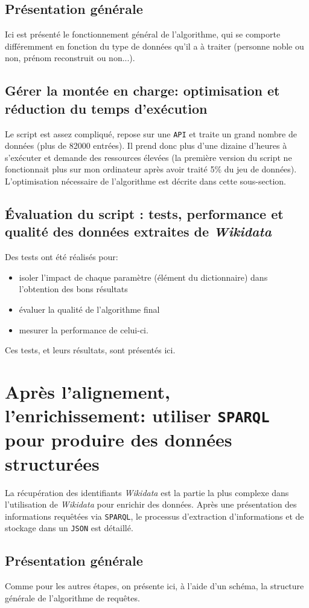 \documentclass[a4paper, 12pt, twoside]{book}
\newcommand{\api}{\texttt{API}}
\newcommand{\json}{\texttt{JSON}}
\newcommand{\sparql}{\texttt{SPARQL}}
\newcommand{\wkd}{\textit{Wikidata}}
\begin{document}
\subsection{Présentation générale}
Ici est présenté le fonctionnement général de l'algorithme, qui se comporte différemment en fonction du type de données qu'il a à traiter (personne noble ou non, prénom reconstruit ou non...).

\subsection{Gérer la montée en charge: optimisation et réduction du temps d'exécution}
Le script est assez compliqué, repose sur une \api{} et traite un grand nombre de données (plus de 82000 entrées). Il prend donc plus d'une dizaine d'heures à s'exécuter et demande des ressources élevées (la première version du script ne fonctionnait plus sur mon ordinateur après avoir traité 5\% du jeu de données). L'optimisation nécessaire de l'algorithme est décrite dans cette sous-section.

\subsection{Évaluation du script : tests, performance et qualité des données extraites de \wkd{}}
Des tests ont été réalisés pour:
\begin{itemize}
	\item isoler l'impact de chaque paramètre (élément du dictionnaire) dans l'obtention des bons résultats
	\item évaluer la qualité de l'algorithme final
	\item mesurer la performance de celui-ci.
\end{itemize}
Ces tests, et leurs résultats, sont présentés ici.

\section{Après l'alignement, l'enrichissement: utiliser \sparql{} pour produire des données structurées}
La récupération des identifiants \wkd{} est la partie la plus complexe dans l'utilisation de \wkd{} pour enrichir des données. Après une présentation des informations requêtées via \sparql{}, le processus d'extraction d'informations et de stockage dans un \json{} est détaillé.

\subsection{Présentation générale}
Comme pour les autres étapes, on présente ici, à l'aide d'un schéma, la structure générale de l'algorithme de requêtes.
\end{document}
